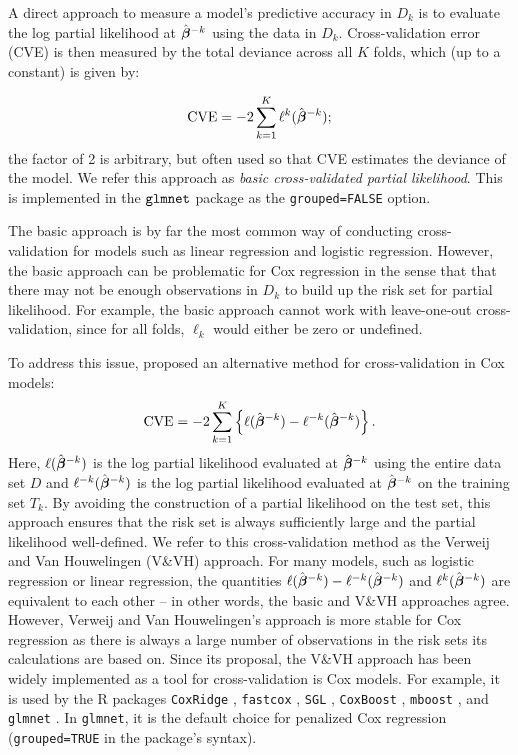 A direct approach to measure a model's predictive accuracy in $D_k$ is to evaluate the log partial likelihood at $\bbh^{-k}$ using the data in $D_k$. Cross-validation error (CVE) is then measured by the total deviance across all $K$ folds, which (up to a constant) is given by:

\begin{equation}
  \label{eq:basic}
  \CVE = -2 \sum_{k=1}^{K} \ell^{k}(\bbh^{-k});
\end{equation}
the factor of 2 is arbitrary, but often used so that CVE estimates the deviance of the model.
We refer this approach as \emph{basic cross-validated partial likelihood}. This is implemented in the $\tt{glmnet}$ package as the \texttt{grouped=FALSE} option.

The basic approach is by far the most common way of conducting cross-validation for models such as linear regression and logistic regression. However, the basic approach can be problematic for Cox regression in the sense that that there may not be enough observations in $D_k$ to build up the risk set for partial likelihood. For example, the basic approach cannot work with leave-one-out cross-validation, since for all folds, $\ell_k$ would either be zero or undefined.

To address this issue, \citet{Verweij1993} proposed an alternative method for cross-validation in Cox models:
\begin{equation}
  \label{eq:VVH}
  \CVE = -2\sum_{k = 1}^K \left\{ \ell(\bbh^{- k})  - \ell^{-k}(\bbh^{- k}) \right\}. 
\end{equation}
Here, $\ell(\bbh^{-k})$ is the log partial likelihood evaluated at $\bbh^{-k}$ using the entire data set $D$ and $\ell^{-k}(\bbh^{-k})$ is the log partial likelihood evaluated at $\bbh^{-k}$ on
the training set $T_k$. By avoiding the construction of a partial likelihood on the test set, this approach ensures that the risk set is always sufficiently large and the partial likelihood well-defined.  We refer to this cross-validation method as the Verweij and Van Houwelingen (V\&VH) approach. For many models, such as logistic regression or linear regression, the quantities $\ell(\bbh^{- k})  - \ell^{-k}(\bbh^{- k})$ and  $\ell^{k}(\bbh^{-k})$ are equivalent to each other -- in other words, the basic and V\&VH approaches agree.  However, Verweij and Van Houwelingen's approach is more stable for Cox regression as there is always a large number of observations in the risk sets its calculations are based on.  Since its proposal, the V\&VH approach has been widely implemented as a tool for cross-validation is Cox models.  For example, it is used by the R packages {\tt CoxRidge} \citep{CoxRidge}, {\tt fastcox} \citep{fastcox}, {\tt SGL} \citep{SGL} , {\tt CoxBoost} \citep{CoxBoost}, {\tt mboost} \citep{mboost}, and {\tt glmnet} \citep{glmnet}.  In {\tt glmnet}, it is the default choice for penalized Cox regression (\texttt{grouped=TRUE} in the package's syntax).

